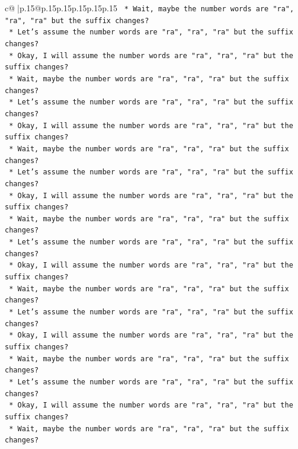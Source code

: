 \documentclass{article}
\begin{document}
{\begin{supertabular}{c@{$\;$}|p{.15\linewidth}@{}p{.15\linewidth}p{.15\linewidth}p{.15\linewidth}p{.15\linewidth}p{.15\linewidth}}
{{{\texttt{    *   Wait, maybe the number words are "ra", "ra", "ra" but the suffix changes?} \\
\texttt{    *   Let's assume the number words are "ra", "ra", "ra" but the suffix changes?} \\
\texttt{    *   Okay, I will assume the number words are "ra", "ra", "ra" but the suffix changes?} \\
\texttt{    *   Wait, maybe the number words are "ra", "ra", "ra" but the suffix changes?} \\
\texttt{    *   Let's assume the number words are "ra", "ra", "ra" but the suffix changes?} \\
\texttt{    *   Okay, I will assume the number words are "ra", "ra", "ra" but the suffix changes?} \\
\texttt{    *   Wait, maybe the number words are "ra", "ra", "ra" but the suffix changes?} \\
\texttt{    *   Let's assume the number words are "ra", "ra", "ra" but the suffix changes?} \\
\texttt{    *   Okay, I will assume the number words are "ra", "ra", "ra" but the suffix changes?} \\
\texttt{    *   Wait, maybe the number words are "ra", "ra", "ra" but the suffix changes?} \\
\texttt{    *   Let's assume the number words are "ra", "ra", "ra" but the suffix changes?} \\
\texttt{    *   Okay, I will assume the number words are "ra", "ra", "ra" but the suffix changes?} \\
\texttt{    *   Wait, maybe the number words are "ra", "ra", "ra" but the suffix changes?} \\
\texttt{    *   Let's assume the number words are "ra", "ra", "ra" but the suffix changes?} \\
\texttt{    *   Okay, I will assume the number words are "ra", "ra", "ra" but the suffix changes?} \\
\texttt{    *   Wait, maybe the number words are "ra", "ra", "ra" but the suffix changes?} \\
\texttt{    *   Let's assume the number words are "ra", "ra", "ra" but the suffix changes?} \\
\texttt{    *   Okay, I will assume the number words are "ra", "ra", "ra" but the suffix changes?} \\
\texttt{    *   Wait, maybe the number words are "ra", "ra", "ra" but the suffix changes?} \\
}}}
\end{supertabular}}
\end{document}

